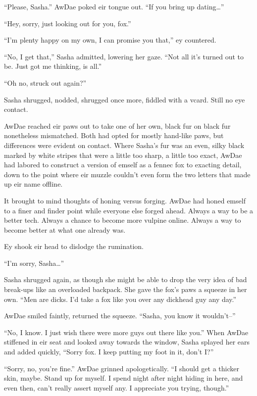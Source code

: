 ``Please, Sasha.'' AwDae poked eir tongue out. ``If you bring up dating\ldots{}''

``Hey, sorry, just looking out for you, fox.''

``I'm plenty happy on my own, I can promise you that,'' ey countered.

``No, I get that,'' Sasha admitted, lowering her gaze. ``Not all it's turned out to be. Just got me thinking, is all.''

``Oh no, struck out again?''

Sasha shrugged, nodded, shrugged once more, fiddled with a vcard. Still no eye contact.

AwDae reached eir paws out to take one of her own, black fur on black fur nonetheless mismatched. Both had opted for mostly hand-like paws, but differences were evident on contact. Where Sasha's fur was an even, silky black marked by white stripes that were a little too sharp, a little too exact, AwDae had labored to construct a version of emself as a fennec fox to exacting detail, down to the point where eir muzzle couldn't even form the two letters that made up eir name offline.

It brought to mind thoughts of honing versus forging. AwDae had honed emself to a finer and finder point while everyone else forged ahead. Always a way to be a better tech. Always a chance to become more vulpine online. Always a way to become better at what one already was.

Ey shook eir head to dislodge the rumination.

``I'm sorry, Sasha\ldots{}''

Sasha shrugged again, as though she might be able to drop the very idea of bad break-ups like an overloaded backpack. She gave the fox's paws a squeeze in her own. ``Men are dicks. I'd take a fox like you over any dickhead guy any day.''

AwDae smiled faintly, returned the squeeze. ``Sasha, you know it wouldn't--''

``No, I know. I just wish there were more guys out there like you.'' When AwDae stiffened in eir seat and looked away towards the window, Sasha splayed her ears and added quickly, ``Sorry fox. I keep putting my foot in it, don't I?''

``Sorry, no, you're fine.'' AwDae grinned apologetically. ``I should get a thicker skin, maybe. Stand up for myself. I spend night after night hiding in here, and even then, can't really assert myself any. I appreciate you trying, though.''

